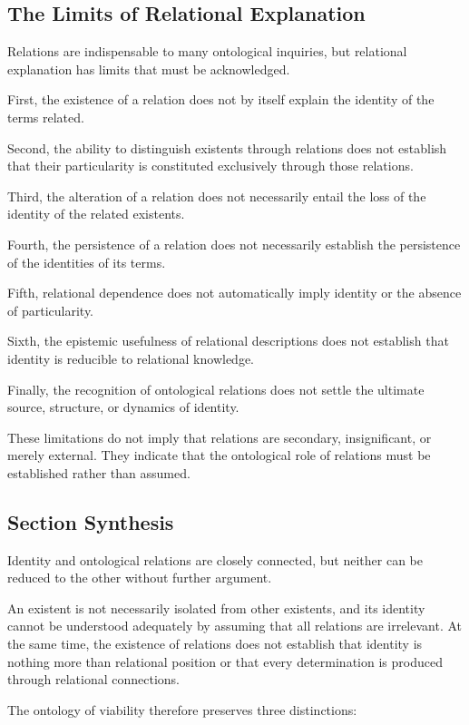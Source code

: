 \subsection{The Limits of Relational Explanation}

Relations are indispensable to many ontological inquiries, but relational explanation has limits that must be acknowledged.

First, the existence of a relation does not by itself explain the identity of the terms related.

Second, the ability to distinguish existents through relations does not establish that their particularity is constituted exclusively through those relations.

Third, the alteration of a relation does not necessarily entail the loss of the identity of the related existents.

Fourth, the persistence of a relation does not necessarily establish the persistence of the identities of its terms.

Fifth, relational dependence does not automatically imply identity or the absence of particularity.

Sixth, the epistemic usefulness of relational descriptions does not establish that identity is reducible to relational knowledge.

Finally, the recognition of ontological relations does not settle the ultimate source, structure, or dynamics of identity.

These limitations do not imply that relations are secondary, insignificant, or merely external. They indicate that the ontological role of relations must be established rather than assumed.

\subsection{Section Synthesis}

Identity and ontological relations are closely connected, but neither can be reduced to the other without further argument.

An existent is not necessarily isolated from other existents, and its identity cannot be understood adequately by assuming that all relations are irrelevant. At the same time, the existence of relations does not establish that identity is nothing more than relational position or that every determination is produced through relational connections.

The ontology of viability therefore preserves three distinctions:

